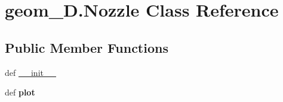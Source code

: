 \hypertarget{classgeom__2D_1_1Nozzle}{\section{geom\-\_\-D.\-Nozzle \-Class \-Reference}
\label{classgeom__2D_1_1Nozzle}
}
\subsection*{\-Public \-Member \-Functions}
\begin{DoxyCompactItemize}
\item 
def \hyperlink{classgeom__2D_1_1Nozzle_ab9e2d3d7d5faddf1bfe843e213c5c04b}{\-\_\-\-\_\-init\-\_\-\-\_\-}
\item 
\hypertarget{classgeom__2D_1_1Nozzle_af51e5abd3c770192384043d6830df016}{def {\bfseries plot}}\label{classgeom__2D_1_1Nozzle_af51e5abd3c770192384043d6830df016}

\end{DoxyCompactItemize}



